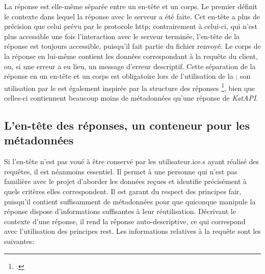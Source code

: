 La réponse est elle-même séparée entre un en-tête et un corps. Le premier définit le contexte dans lequel la réponse avec le serveur a été faite. Cet en-tête a plus de précision que celui prévu par le protocole \gls{http}; contrairement à celui-ci, qui n'est plus accessible une fois l'interaction avec le serveur terminée, l'en-tête de la réponse est toujours accessible, puisqu'il fait partie du fichier renvoyé. Le corps de la réponse en lui-même contient les données correspondant à la requête du client, ou, si une erreur a eu lieu, un message d'erreur descriptif. Cette séparation de la réponse en un en-tête et un corps est obligatoire lors de l'utilisation de la \tei{}; son utilisation par le \json{} est également inspirée par la structure des réponses \sparql{}\footcite{beckett_sparql_2013}, bien que celles-ci contiennent beaucoup moins de métadonnées qu'une réponse de \textit{KatAPI}.

\subsection{L'en-tête des réponses, un conteneur pour les métadonnées}
Si l'en-tête n'est pas voué à être conservé par les utilisateur.ice.s ayant réalisé des requêtes, il est néanmoins essentiel. Il permet à une personne qui n'est pas familière avec le projet d'aborder les données reçues et identifie précisément à quels critères elles correspondent. Il est garant du respect des principes \gls{fair}, puisqu'il contient suffisamment de métadonnées pour que quiconque manipule la réponse dispose d'informations suffisantes à leur réutilisation. Décrivant le contexte d'une réponse, il rend la réponse auto-descriptive, ce qui correspond avec l'utilisation des principes \gls{rest}. Les informations relatives à la requête sont les suivantes:

